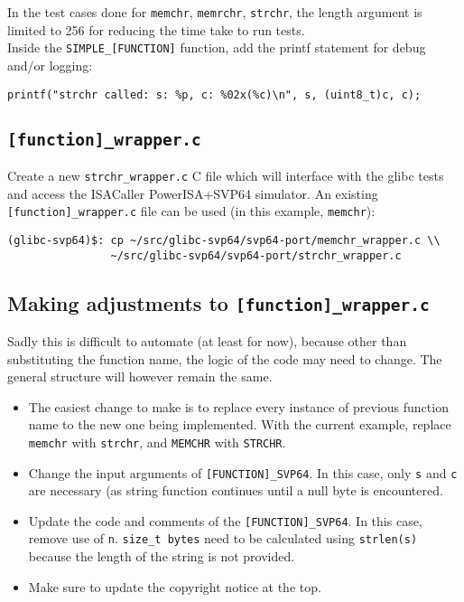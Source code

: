 In the test cases done for \texttt{memchr}, \texttt{memrchr}, \texttt{strchr},
the length argument is limited to 256 for reducing the time take to run tests.\\

Inside the \texttt{SIMPLE\_[FUNCTION]} function, add the printf statement
for debug and/or logging:

\begin{verbatim}
printf("strchr called: s: %p, c: %02x(%c)\n", s, (uint8_t)c, c);
\end{verbatim}

\subsection{\texttt{[function]\_wrapper.c}}

Create a new \texttt{strchr\_wrapper.c} C file which will interface with
the glibc tests and access the ISACaller PowerISA+\acrshort{SVP64} simulator.
An existing \texttt{[function]\_wrapper.c} file can be used (in this example,
\texttt{memchr}):

\begin{verbatim}
(glibc-svp64)$: cp ~/src/glibc-svp64/svp64-port/memchr_wrapper.c \\
                ~/src/glibc-svp64/svp64-port/strchr_wrapper.c
\end{verbatim}

\subsection{Making adjustments to \texttt{[function]\_wrapper.c}}

Sadly this is difficult to automate (at least for now), because other than
substituting the function name, the logic of the code may need to change.
The general structure will however remain the same.

\begin{itemize}
  \item The easiest change to make is to replace every instance of previous
  function name to the new one being implemented. With the current example,
  replace \texttt{memchr} with \texttt{strchr},
  and \texttt{MEMCHR} with \texttt{STRCHR}.
  \item Change the input arguments of \texttt{[FUNCTION]\_SVP64}.
  In this case, only \texttt{s} and \texttt{c} are necessary
  (as string function continues until a null byte is encountered.
  \item Update the code and comments of the \texttt{[FUNCTION]\_SVP64}.
  In this case, remove use of \texttt{n}. \texttt{size\_t bytes} need to be
  calculated using \texttt{strlen(s)} because the length of the string
  is not provided.
  \item Make sure to update the copyright notice at the top.
\end{itemize}

